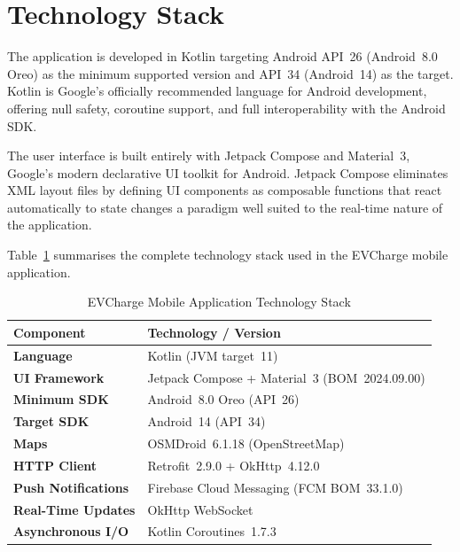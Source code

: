 \documentclass[12pt,a4paper]{report}
\begin{document}
\section{Technology Stack}

The application is developed in Kotlin targeting Android API~26 (Android~8.0 Oreo) as the
minimum supported version and API~34 (Android~14) as the target. Kotlin is Google's officially
recommended language for Android development, offering null safety, coroutine support, and full
interoperability with the Android SDK.

The user interface is built entirely with Jetpack Compose and Material~3, Google's modern
declarative UI toolkit for Android. Jetpack Compose eliminates XML layout files by defining UI
components as composable functions that react automatically to state changes a paradigm well
suited to the real-time nature of the application.

Table~\ref{tab:mobile-stack} summarises the complete technology stack used in the EVCharge
mobile application.

\begin{table}[h!]
  \centering
  \caption{EVCharge Mobile Application Technology Stack}
  \label{tab:mobile-stack}
  \renewcommand{\arraystretch}{1.3}
  \begin{tabular}{|>{\bfseries}p{4.5cm}|p{9cm}|}
    \hline
    Component           & Technology / Version \\ \hline
    Language            & Kotlin (JVM target~11) \\ \hline
    UI Framework        & Jetpack Compose + Material~3 (BOM~2024.09.00) \\ \hline
    Minimum SDK         & Android~8.0 Oreo (API~26) \\ \hline
    Target SDK          & Android~14 (API~34) \\ \hline
    Maps                & OSMDroid~6.1.18 (OpenStreetMap) \\ \hline
    HTTP Client         & Retrofit~2.9.0 + OkHttp~4.12.0 \\ \hline
    Push Notifications  & Firebase Cloud Messaging (FCM BOM~33.1.0) \\ \hline
    Real-Time Updates   & OkHttp WebSocket \\ \hline
    Asynchronous I/O    & Kotlin Coroutines~1.7.3 \\ \hline
  \end{tabular}
\end{table}
\end{document}
